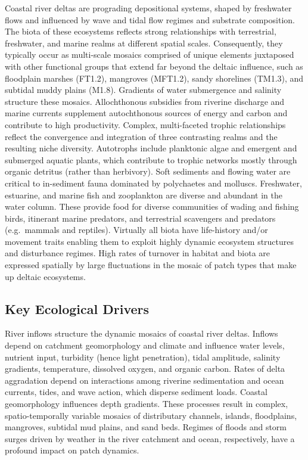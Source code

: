 \documentclass[
  letterpaper,
  DIV=11,
  numbers=noendperiod]{scrartcl}
\begin{document}
Coastal river deltas are prograding depositional systems, shaped by
freshwater flows and influenced by wave and tidal flow regimes and
substrate composition. The biota of these ecosystems reflects strong
relationships with terrestrial, freshwater, and marine realms at
different spatial scales. Consequently, they typically occur as
multi-scale mosaics comprised of unique elements juxtaposed with other
functional groups that extend far beyond the deltaic influence, such as
floodplain marshes (FT1.2), mangroves (MFT1.2), sandy shorelines
(TM1.3), and subtidal muddy plains (M1.8). Gradients of water
submergence and salinity structure these mosaics. Allochthonous
subsidies from riverine discharge and marine currents supplement
autochthonous sources of energy and carbon and contribute to high
productivity. Complex, multi-faceted trophic relationships reflect the
convergence and integration of three contrasting realms and the
resulting niche diversity. Autotrophs include planktonic algae and
emergent and submerged aquatic plants, which contribute to trophic
networks mostly through organic detritus (rather than herbivory). Soft
sediments and flowing water are critical to in-sediment fauna dominated
by polychaetes and molluscs. Freshwater, estuarine, and marine fish and
zooplankton are diverse and abundant in the water column. These provide
food for diverse communities of wading and fishing birds, itinerant
marine predators, and terrestrial scavengers and predators (e.g.~mammals
and reptiles). Virtually all biota have life-history and/or movement
traits enabling them to exploit highly dynamic ecosystem structures and
disturbance regimes. High rates of turnover in habitat and biota are
expressed spatially by large fluctuations in the mosaic of patch types
that make up deltaic ecosystems.

\subsection{Key Ecological Drivers}\label{key-ecological-drivers-49}

River inflows structure the dynamic mosaics of coastal river deltas.
Inflows depend on catchment geomorphology and climate and influence
water levels, nutrient input, turbidity (hence light penetration), tidal
amplitude, salinity gradients, temperature, dissolved oxygen, and
organic carbon. Rates of delta aggradation depend on interactions among
riverine sedimentation and ocean currents, tides, and wave action, which
disperse sediment loads. Coastal geomorphology influences depth
gradients. These processes result in complex, spatio-temporally variable
mosaics of distributary channels, islands, floodplains, mangroves,
subtidal mud plains, and sand beds. Regimes of floods and storm surges
driven by weather in the river catchment and ocean, respectively, have a
profound impact on patch dynamics.
\end{document}
